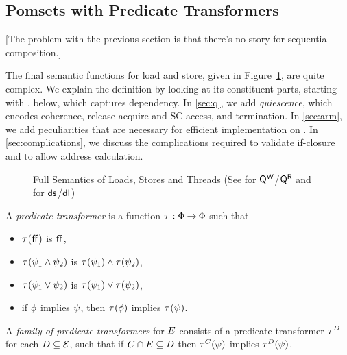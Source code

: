 \subsection{Pomsets with Predicate Transformers}

[The problem with the previous section is that there's no story for
sequential composition.]

The final semantic functions for load and store, given in
Figure~\ref{fig:full}, are quite complex.  We explain the definition by
looking at its constituent parts, starting with
, below, which captures dependency.  In
\textsection\ref{sec:q}, we add \emph{quiescence}, which encodes coherence,
release-acquire and SC access, and termination.  In
\textsection\ref{sec:arm}, we add peculiarities that are necessary for
efficient implementation on \armeight.  In
\textsection\ref{sec:complications}, we discuss the complications required
to validate if-closure and to allow address calculation.
\begin{figure*}
  \begin{center}
    \begin{minipage}{0.905\textwidth}
      
    \end{minipage}
  \end{center}
  \caption{Full Semantics of Loads, Stores and Threads (See 
    for $\mathsf{Q}_{}^{\mathsf{W}}$/$\mathsf{Q}_{}^{\mathsf{R}}$ and  for $\mathsf{ds}_{}^{}$/$\mathsf{dl}_{}^{}{}$)}
  \label{fig:full}
\end{figure*}    


\begin{definition}
  A \emph{predicate transformer} is a %
  function
  $\aTr{}{}:\Formulae\fun\Formulae$ such that
  \begin{itemize}
  \item $\aTr{}{\FALSE}$ is $\mkern.6mu\mathsf{ff}\mkern.6mu$,    
  \item $\aTr{}{\bForm_1\land\bForm_2}$ is $\aTr{}{\bForm_1}\land\aTr{}{\bForm_2}$,    
  \item $\aTr{}{\bForm_1\lor\bForm_2}$ is $\aTr{}{\bForm_1}\lor\aTr{}{\bForm_2}$, 
  \item if $\phi$ implies $\psi$, then $\aTr{}{\aForm}$ implies $\aTr{}{\bForm}$.
  \end{itemize}
\end{definition}

\begin{definition}
  A \emph{family of predicate transformers} for $E$ consists of a
  predicate transformer $\aTr{\bEvs}{}$ for each $D\subseteq\mathcal{E}$,
  such that if $C \cap E \subseteq D$ then $\aTr{\cEvs}{\bForm}$
  implies $\aTr{\bEvs}{\bForm}$.
\end{definition}

